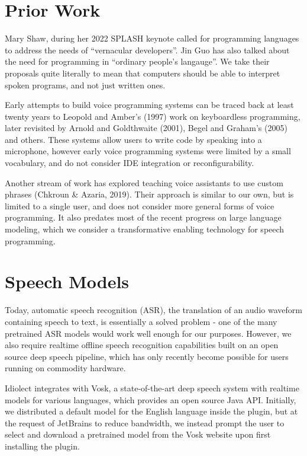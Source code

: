 \documentclass[conference]{IEEEtran}
\begin{document}
\section{Prior Work}

Mary Shaw, during her 2022 SPLASH keynote called for programming languages to address the needs of ``vernacular developers''. Jin Guo has also talked about the need for programming in ``ordinary people's langauge''. We take their proposals quite literally to mean that computers should be able to interpret spoken programs, and not just written ones.

Early attempts to build voice programming systems can be traced back at least twenty years to Leopold and Amber's (1997) work on keyboardless programming, later revisited by Arnold and Goldthwaite (2001), Begel and Graham's (2005) and others. These systems allow users to write code by speaking into a microphone, however early voice programming systems were limited by a small vocabulary, and do not consider IDE integration or reconfigurability.

Another stream of work has explored teaching voice assistants to use custom phrases (Chkroun \& Azaria, 2019). Their approach is similar to our own, but is limited to a single user, and does not consider more general forms of voice programming. It also predates most of the recent progress on large language modeling, which we consider a transformative enabling technology for speech programming.

\section{Speech Models}

Today, automatic speech recognition (ASR), the translation of an audio waveform containing speech to text, is essentially a solved problem - one of the many pretrained ASR models would work well enough for our purposes. However, we also require realtime offline speech recognition capabilities built on an open source deep speech pipeline, which has only recently become possible for users running on commodity hardware.

Idiolect integrates with Vosk, a state-of-the-art deep speech system with realtime models for various languages, which provides an open source Java API. Initially, we distributed a default model for the English language inside the plugin, but at the request of JetBrains to reduce bandwidth, we instead prompt the user to select and download a pretrained model from the Vosk website upon first installing the plugin.
\end{document}
